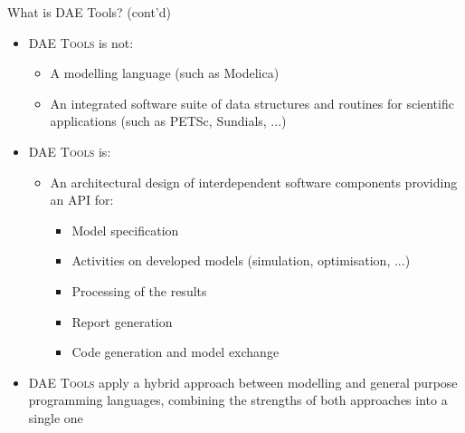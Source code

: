 \documentclass[compress,newPxFont,sthlmFooter]{beamer}
\begin{document}
\begin{frame}{What is DAE Tools? (cont'd)} 
  \begin{itemize}
    \item \textsc{DAE Tools} \alert{is not}:
        \begin{itemize}
            \item A modelling language (such as Modelica)
            \item An integrated software suite of data structures and routines for scientific applications (such as PETSc, Sundials, ...)
        \end{itemize}
    \item \textsc{DAE Tools} \alert{is}:
        \begin{itemize}
            \item An \alert{architectural design of interdependent software components}
                  providing an API for:
                \begin{itemize}
                    \item \alert{Model specification}
                    \item Activities on developed models (\alert{simulation}, \alert{optimisation}, ...)
                    \item \alert{Processing of the results}
                    \item \alert{Report generation}
                    \item \alert{Code generation} and \alert{model exchange}
                \end{itemize}
        \end{itemize}
    \item \textsc{DAE Tools} apply a \alert{hybrid approach} between \alert{modelling} and \alert{general purpose} programming languages,
          \alert{combining the strengths of both approaches} into a single one
  \end{itemize}
\end{frame}
\end{document}
